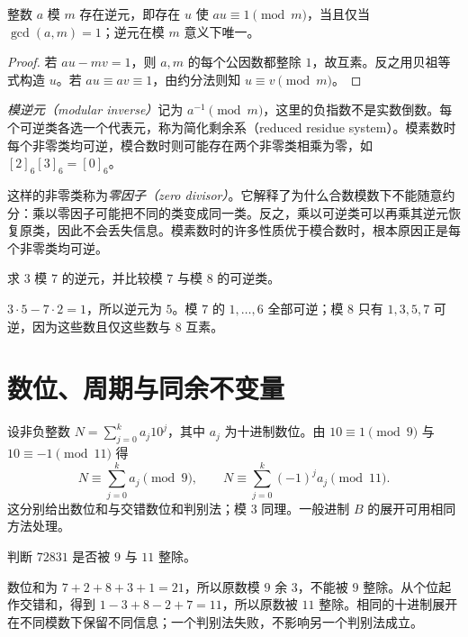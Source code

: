 \begin{theorem}[模逆元]
\label{thm:modular-inverse}
整数 $a$ 模 $m$ 存在逆元，即存在 $u$ 使 $au\equiv1\pmod m$，当且仅当 $\gcd(a,m)=1$；逆元在模 $m$ 意义下唯一。
\end{theorem}
\begin{proof}
若 $au-mv=1$，则 $a,m$ 的每个公因数都整除 $1$，故互素。反之用贝祖等式构造 $u$。若 $au\equiv av\equiv1$，由约分法则知 $u\equiv v\pmod m$。
\end{proof}

\emph{模逆元（modular inverse）}记为 $a^{-1}\pmod m$，这里的负指数不是实数倒数。每个可逆类各选一个代表元，称为简化剩余系（reduced residue system）。模素数时每个非零类均可逆，模合数时则可能存在两个非零类相乘为零，如 $[2]_6[3]_6=[0]_6$。

这样的非零类称为\emph{零因子（zero divisor）}。它解释了为什么合数模数下不能随意约分：乘以零因子可能把不同的类变成同一类。反之，乘以可逆类可以再乘其逆元恢复原类，因此不会丢失信息。模素数时的许多性质优于模合数时，根本原因正是每个非零类均可逆。

\begin{example}
求 $3$ 模 $7$ 的逆元，并比较模 $7$ 与模 $8$ 的可逆类。
\end{example}
\begin{solve}
$3\cdot5-7\cdot2=1$，所以逆元为 $5$。模 $7$ 的 $1,\ldots,6$ 全部可逆；模 $8$ 只有 $1,3,5,7$ 可逆，因为这些数且仅这些数与 $8$ 互素。
\end{solve}

\section{数位、周期与同余不变量}

设非负整数 $N=\sum_{j=0}^k a_j10^j$，其中 $a_j$ 为十进制数位。由 $10\equiv1\pmod9$ 与 $10\equiv-1\pmod{11}$ 得
\[
 N\equiv\sum_{j=0}^k a_j\pmod9,\qquad
 N\equiv\sum_{j=0}^k(-1)^ja_j\pmod{11}.
\]
这分别给出数位和与交错数位和判别法；模 $3$ 同理。一般进制 $B$ 的展开可用相同方法处理。

\begin{example}[用不同模数检查同一个整数]
判断 $72831$ 是否被 $9$ 与 $11$ 整除。
\end{example}
\begin{solve}
数位和为 $7+2+8+3+1=21$，所以原数模 $9$ 余 $3$，不能被 $9$ 整除。从个位起作交错和，得到 $1-3+8-2+7=11$，所以原数被 $11$ 整除。相同的十进制展开在不同模数下保留不同信息；一个判别法失败，不影响另一个判别法成立。
\end{solve}

